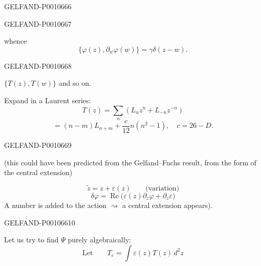 \begin{GelfandAdjacentEvidence}{GELFAND-P001066}{6}

\end{GelfandAdjacentEvidence}
\begin{GelfandAdjacentEvidence}{GELFAND-P001066}{7}


whence
\begin{equation*}
\{\varphi(z),\partial_w\varphi(w)\}=\gamma\delta(z-w).
\tag{17}
\end{equation*}
\end{GelfandAdjacentEvidence}
\begin{GelfandAdjacentEvidence}{GELFAND-P001066}{8}

\(\{T(z),T(w)\}\) and so on.

Expand in a Laurent series:
\begin{equation*}
T(z)=\sum_n(L_n z^n+L_{-n}z^{-n})
\tag{18}
\end{equation*}
\begin{equation*}
[L_n,L_m]=(n-m)L_{n+m}+\frac{c}{12}n(n^2-1),
\quad c=26-D.
\tag{19}
\end{equation*}
\end{GelfandAdjacentEvidence}
\begin{GelfandAdjacentEvidence}{GELFAND-P001066}{9}

(this could have been predicted from the Gelfand–Fuchs result, from the form of the central extension)

\[
\widetilde z=z+\varepsilon(z)\qquad\text{(variation)}
\]
\[
\delta\varphi=\operatorname{Re}
  \bigl(\varepsilon(z)\partial_z\varphi+\partial_z\varepsilon\bigr)
\]
A number is added to the action \(\rightsquigarrow\) a central extension appears).
\end{GelfandAdjacentEvidence}
\begin{GelfandAdjacentEvidence}{GELFAND-P001066}{10}


Let us try to find \(\Psi\) purely algebraically:
\begin{equation*}
\text{Let}\qquad T_\varepsilon=\int\varepsilon(z)T(z)\,d^2z
\tag{20}
\end{equation*}
\end{GelfandAdjacentEvidence}
